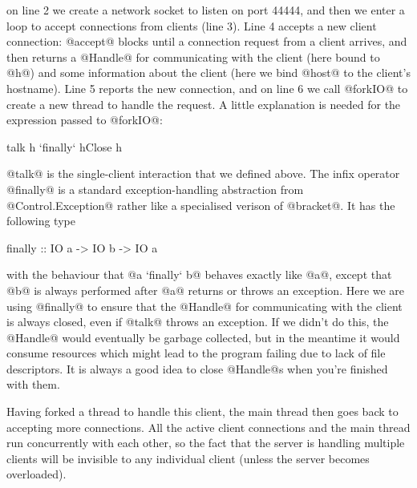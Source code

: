 
\noindent on line 2 we create a network socket to listen on port
44444, and then we enter a loop to accept connections from clients
(line 3).  Line 4 accepts a new client connection: @accept@ blocks
until a connection request from a client arrives, and then returns a
@Handle@ for communicating with the client (here bound to @h@) and
some information about the client (here we bind @host@ to the client's
hostname).  Line 5 reports the new connection, and on line 6 we call
@forkIO@ to create a new thread to handle the request.  A little
explanation is needed for the expression passed to @forkIO@:

\begin{haskell}
   talk h `finally` hClose h
\end{haskell}

\noindent @talk@ is the single-client interaction that we defined
above.  The infix operator @finally@ is a standard exception-handling
abstraction from @Control.Exception@ rather like a specialised verison
of @bracket@.  It has the following type

\begin{haskell}
finally :: IO a -> IO b -> IO a
\end{haskell}

\noindent with the behaviour that @a `finally` b@ behaves exactly like
@a@, except that @b@ is always performed after @a@ returns or throws
an exception.  Here we are using @finally@ to ensure that the @Handle@
for communicating with the client is always closed, even if @talk@
throws an exception.  If we didn't do this, the @Handle@ would
eventually be garbage collected, but in the meantime it would consume
resources which might lead to the program failing due to lack of file
descriptors.  It is always a good idea to close @Handle@s when you're
finished with them.

Having forked a thread to handle this client, the main thread then
goes back to accepting more connections.  All the active client
connections and the main thread run concurrently with each other, so
the fact that the server is handling multiple clients will be
invisible to any individual client (unless the server becomes
overloaded).

